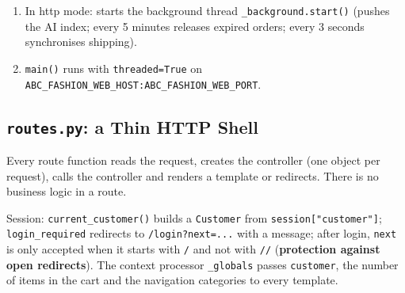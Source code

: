 \begin{enumerate}
\def\labelenumi{\arabic{enumi}.}
\setcounter{enumi}{5}
\tightlist
\item
  In http mode: starts the background thread
  \texttt{\_\allowbreak{}background.\allowbreak{}start(\allowbreak{})} (pushes the AI index; every 5 minutes
  releases expired orders; every 3 seconds synchronises shipping).
\item
  \texttt{main(\allowbreak{})} runs with \texttt{threaded=\allowbreak{}True} on
  \texttt{ABC\_\allowbreak{}FASHION\_\allowbreak{}WEB\_\allowbreak{}HOST:ABC\_\allowbreak{}FASHION\_\allowbreak{}WEB\_\allowbreak{}PORT}.
\end{enumerate}

\hypertarget{routes.py-a-thin-http-shell}{%
\subsection{\texorpdfstring{\texttt{routes.\allowbreak{}py}: a Thin HTTP
Shell}{routes.py: a Thin HTTP Shell}}\label{routes.py-a-thin-http-shell}}

Every route function reads the request, creates the controller (one
object per request), calls the controller and renders a template or
redirects. There is no business logic in a route.

Session: \texttt{current\_\allowbreak{}customer(\allowbreak{})} builds a \texttt{Customer} from
\texttt{session{[}"customer"{]}}; \texttt{login\_\allowbreak{}required} redirects to
\texttt{/\allowbreak{}login?next=\allowbreak{}.\allowbreak{}.\allowbreak{}.\allowbreak{}} with a message; after login, \texttt{next} is
only accepted when it starts with \texttt{/\allowbreak{}} and not with \texttt{/\allowbreak{}/\allowbreak{}}
(\textbf{protection against open redirects}). The context processor
\texttt{\_\allowbreak{}globals} passes \texttt{customer}, the number of items in the
cart and the navigation categories to every template.

